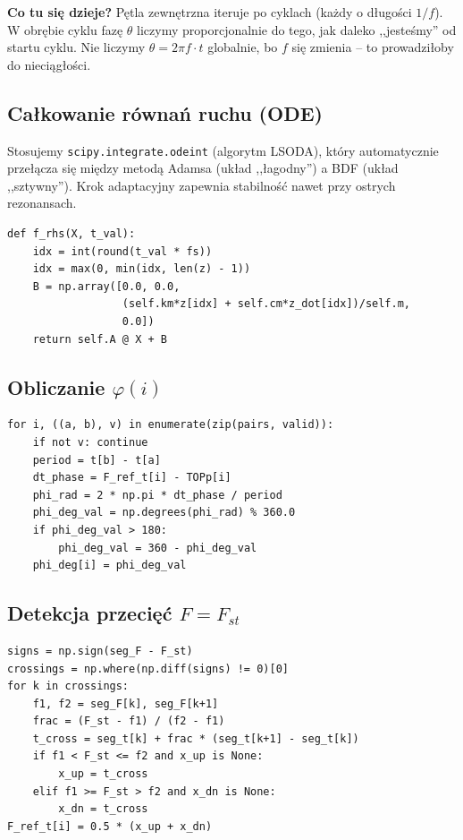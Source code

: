 \documentclass[11pt,a4paper]{article}
\theoremstyle{plainpol}
\begin{document}
\textbf{Co tu się dzieje?} Pętla zewnętrzna iteruje po cyklach (każdy
o długości $1/f$). W obrębie cyklu fazę $\theta$ liczymy
proporcjonalnie do tego, jak daleko ,,jesteśmy'' od startu cyklu. Nie
liczymy $\theta = 2\pi f \cdot t$ globalnie, bo $f$ się zmienia -- to
prowadziłoby do nieciągłości.

\subsection{Całkowanie równań ruchu (ODE)}

Stosujemy \texttt{scipy.integrate.odeint} (algorytm LSODA), który
automatycznie przełącza się między metodą Adamsa (układ ,,łagodny'')
a BDF (układ ,,sztywny''). Krok adaptacyjny zapewnia stabilność nawet
przy ostrych rezonansach.

\begin{lstlisting}[style=py, caption={Funkcja prawej strony układu \cref{eq:stan}.}]
def f_rhs(X, t_val):
    idx = int(round(t_val * fs))
    idx = max(0, min(idx, len(z) - 1))
    B = np.array([0.0, 0.0,
                  (self.km*z[idx] + self.cm*z_dot[idx])/self.m,
                  0.0])
    return self.A @ X + B
\end{lstlisting}

\subsection{Obliczanie $\varphi(i)$}

\begin{lstlisting}[style=py, caption={Wyznaczenie $\varphi(i)$ z procedury MinPhaseShift.}]
for i, ((a, b), v) in enumerate(zip(pairs, valid)):
    if not v: continue
    period = t[b] - t[a]
    dt_phase = F_ref_t[i] - TOPp[i]
    phi_rad = 2 * np.pi * dt_phase / period
    phi_deg_val = np.degrees(phi_rad) % 360.0
    if phi_deg_val > 180:
        phi_deg_val = 360 - phi_deg_val
    phi_deg[i] = phi_deg_val
\end{lstlisting}

\subsection{Detekcja przecięć $F = F_{st}$}

\begin{lstlisting}[style=py, caption={Detekcja przecięć $F(t) = F_{st}$.}]
signs = np.sign(seg_F - F_st)
crossings = np.where(np.diff(signs) != 0)[0]
for k in crossings:
    f1, f2 = seg_F[k], seg_F[k+1]
    frac = (F_st - f1) / (f2 - f1)
    t_cross = seg_t[k] + frac * (seg_t[k+1] - seg_t[k])
    if f1 < F_st <= f2 and x_up is None:
        x_up = t_cross
    elif f1 >= F_st > f2 and x_dn is None:
        x_dn = t_cross
F_ref_t[i] = 0.5 * (x_up + x_dn)
\end{lstlisting}
\end{document}
